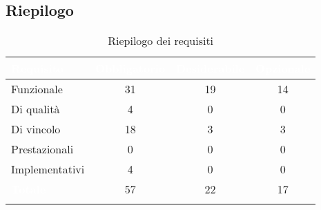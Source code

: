 \subsection{Riepilogo}
\begingroup
\setlength{\tabcolsep}{10pt}
\renewcommand{\arraystretch}{1.5}
\begin{xltabular}{\textwidth}{| X | c | c | c |}
    \hline
     \textbf{\textcolor{white}{Requisito}} & \textbf{\textcolor{white}{Obbligatorio}} & \textbf{\textcolor{white}{Desiderabile}} & \textbf{\textcolor{white}{Opzionale}}\\
    \hline
    \endhead
    Funzionale & 31 & 19 & 14 \\
    \hline
    Di qualità & 4 & 0 & 0 \\
    \hline
    Di vincolo & 18 & 3 & 3 \\
    \hline
    Prestazionali & 0 & 0 & 0 \\
    \hline
    Implementativi & 4 & 0 & 0 \\
    \hline
     \textbf{\textcolor{white}{Totale}} & 57 & 22 & 17 \\
    \hline
     \caption{Riepilogo dei requisiti}
    \label{tab:riepilogo}
\end{xltabular}
\endgroup



